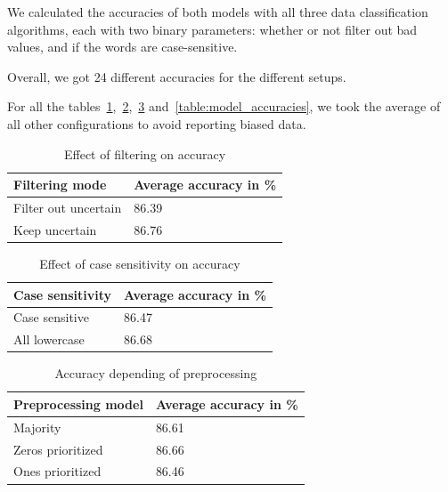 \documentclass[11pt]{article}
\begin{document}
We calculated the accuracies of both models with all three data classification algorithms,
each with two binary parameters: whether or not filter out bad values, and if the words are case-sensitive.

Overall, we got 24 different accuracies for the different setups.

For all the tables~\ref{table:filter_accuracies},~\ref{table:case_accuracies},~\ref{table:preprocessing_accuracies} and~\ref{table:model_accuracies}, we took the average of all other configurations to avoid reporting biased data.

\begin{table}[htb]
\begin{center}
\begin{tabular}{l|l}
\hline \bf Filtering mode & \bf Average accuracy in \% \\ \hline
Filter out uncertain & 86.39 \\
Keep uncertain & 86.76 %
\end{tabular}
\end{center}
\caption{Effect of filtering on accuracy}
\label{table:filter_accuracies}
\end{table}

\begin{table}[htb]
\begin{center}
\begin{tabular}{l|l}
\hline \bf Case sensitivity & \bf Average accuracy in \% \\ \hline
Case sensitive & 86.47 \\
All lowercase & 86.68 %
\end{tabular}
\end{center}
\caption{Effect of case sensitivity on accuracy}
\label{table:case_accuracies}
\end{table}

\begin{table}[htb]
\begin{center}
\begin{tabular}{l|l}
\hline \bf Preprocessing model & \bf Average accuracy in \% \\ \hline
Majority & 86.61 \\
Zeros prioritized & 86.66 \\
Ones prioritized & 86.46 %
\end{tabular}
\end{center}
\caption{Accuracy depending of preprocessing}
\label{table:preprocessing_accuracies}
\end{table}
\end{document}
